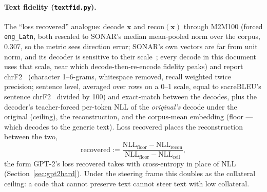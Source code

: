 \paragraph{Text fidelity (\texttt{textfid.py}).}
The ``loss recovered'' analogue: decode $\mathbf{x}$ and $\mathrm{recon}(\mathbf{x})$
through M2M100 (forced \texttt{eng\_Latn}, both rescaled to SONAR's median
mean-pooled norm over the corpus, 0.307, so the metric sees direction
error; SONAR's own vectors are far from unit norm, and its decoder is
sensitive to their scale~\cite{qiu2026unifiedvisionlanguagemodelingconcept};
every decode in this document uses that scale, near which
decode-then-re-encode fidelity peaks) and report
chrF2~\cite{popovic-2015-chrf,popovic2016} (character 1--6-grams,
whitespace removed, recall weighted twice precision; sentence level,
averaged over rows on a 0--1 scale, equal to sacreBLEU's sentence
chrF2~\cite{post2018} divided by 100) and exact-match between the decodes, plus the
decoder's teacher-forced per-token NLL of the \emph{original's} decode
under the original (ceiling), the reconstruction, and the corpus-mean
embedding (floor --- which decodes to the generic text). Loss recovered
places the reconstruction between the two,
\begin{equation}
	\mathrm{recovered} := \frac{\mathrm{NLL}_{\mathrm{floor}} - \mathrm{NLL}_{\mathrm{recon}}}
	                           {\mathrm{NLL}_{\mathrm{floor}} - \mathrm{NLL}_{\mathrm{ceil}}},
	\label{eq:lossrec}
\end{equation}
the form GPT-2's loss recovered takes with cross-entropy in place of NLL
(Section~\ref{sec:gpt2hard}). Under the steering frame this doubles as
the collateral ceiling: a code that cannot preserve text cannot steer
text with low collateral.

